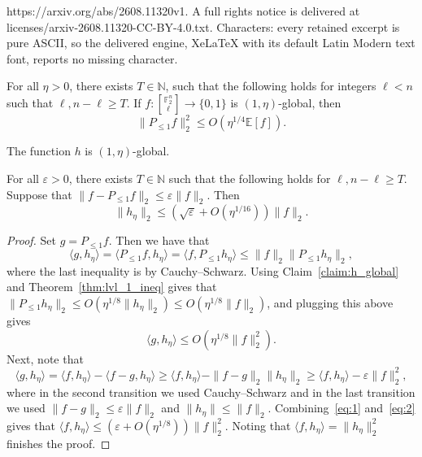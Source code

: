 \documentclass[10pt,a4paper]{amsart}
\newcommand\E{\mathbb{E}}
\newcommand\eps{\varepsilon}
\newcommand\inner[2]{\langle{#1},{#2}\rangle}
\newcommand\norm[1]{\| #1 \|}
\providecommand{\sqbinom}[2]{\genfrac{[}{]}{0pt}{}{#1}{#2}}
\renewcommand\geq{\geqslant}
\renewcommand\leq{\leqslant}
\begin{document}
https://arxiv.org/abs/2608.11320v1. A full rights notice is delivered at licenses/arxiv-2608.11320-CC-BY-4.0.txt. Characters: every retained excerpt is pure ASCII, so the delivered engine, XeLaTeX with its default Latin Modern text font, reports no missing character.
\begin{thm}\label{thm:lvl_1_ineq}
    For all $\eta>0$, there exists $T\in\mathbb{N}$, such that the following holds for integers $\ell<n$ such that 
    $\ell, n-\ell\geq T$. If $f\colon {\sqbinom{\mathbb{F}_2^n}{\ell}}\to\{0,1\}$ is $(1,\eta)$-global, then
    \[
    \norm{P_{\leq 1} f}_2^2\leq O(\eta^{1/4} \E[f]).
    \]
\end{thm}

\begin{claim}\label{claim:h_global}
    The function $h$ is $(1,\eta)$-global.
\end{claim}

\begin{claim}\label{claim:h_close_to_0}
   For all $\eps>0$, there exists $T\in\mathbb{N}$ such that the following holds for $\ell,n-\ell\geq T$. Suppose that $\norm{f-P_{\leq 1}f}_2\leq \eps \norm{f}_2$. Then
   \[
   \norm{h_{\eta}}_2
   \leq (\sqrt{\eps}+O(\eta^{1/16}))\norm{f}_2.
   \]
\end{claim}

\begin{proof}
    Set $g=P_{\leq 1} f$. Then we have that
    \[
    \inner{g}{h_{\eta}}
    =\inner{P_{\leq 1} f}{h_{\eta}}
    =\inner{f}{P_{\leq 1} h_{\eta}}
    \leq \norm{f}_2\norm{P_{\leq 1}h_{\eta}}_2,
    \]
    where the last inequality is by Cauchy--Schwarz. Using Claim~\ref{claim:h_global} and Theorem~\ref{thm:lvl_1_ineq} gives that 
    $\norm{P_{\leq 1}h_{\eta}}_2\leq O(\eta^{1/8}\norm{h_{\eta}}_2)
    \leq O(\eta^{1/8}\norm{f}_2)$, and plugging this above gives
    \begin{equation}\label{eq:1}
    \inner{g}{h_{\eta}}\leq 
    O\left(\eta^{1/8}\norm{f}_2^2\right).
    \end{equation}
    Next, note that
    \begin{equation}\label{eq:2}
    \inner{g}{h_{\eta}}
    = 
    \inner{f}{h_{\eta}}
    -
    \inner{f-g}{h_{\eta}}
    \geq 
    \inner{f}{h_{\eta}}
    -\norm{f-g}_2\norm{h_{\eta}}_2
    \geq 
    \inner{f}{h_{\eta}}
    -\eps \norm{f}_2^2,
    \end{equation}
    where in the second transition we used Cauchy--Schwarz and in the last transition we used 
    $\norm{f-g}_2\leq \eps \norm{f}_2$ and $\norm{h_{\eta}}\leq \norm{f}_2$. Combining~\eqref{eq:1} and~\eqref{eq:2} gives that 
    $\inner{f}{h_{\eta}}\leq (\eps+O(\eta^{1/8}))\norm{f}_2^2$. Noting that $\inner{f}{h_{\eta}}=\norm{h_{\eta}}_2^2$ finishes the proof.
\end{proof}
\end{document}

